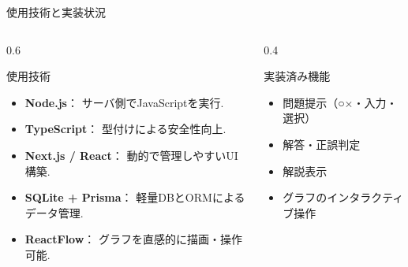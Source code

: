 \documentclass[aspectratio=169]{beamer}
\begin{document}
\begin{frame}{使用技術と実装状況}


\begin{columns}[T] %
  \begin{column}{0.6\textwidth}
    \begin{block}{使用技術}
      \begin{itemize}
        \setlength{\parskip}{0.3em}
        \item \textbf{Node.js}：
              サーバ側でJavaScriptを実行\cite{nodejs}.
        \item \textbf{TypeScript}：
              型付けによる安全性向上\cite{TypeScript}.
        \item \textbf{Next.js / React}：
              動的で管理しやすいUI構築\cite{Next.js,React/Next.js,React,React2025}.
        \item \textbf{SQLite + Prisma}：
              軽量DBとORMによるデータ管理\cite{sqlite,Prisma}.
        \item \textbf{ReactFlow}：
              グラフを直感的に描画・操作可能\cite{reactflow}.
      \end{itemize}
			\vspace{1em}
    \end{block}
  \end{column}

  \begin{column}{0.4\textwidth}
    \begin{block}{実装済み機能}
      \begin{itemize}
        \setlength{\parskip}{0.5em}
        \item 問題提示（○×・入力・選択）
        \item 解答・正誤判定
        \item 解説表示
        \item グラフのインタラクティブ操作
      \end{itemize}
			\vspace{1em}
    \end{block}
  \end{column}
\end{columns}

\end{frame}
\end{document}
